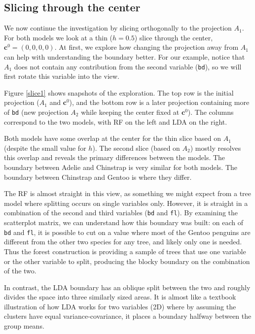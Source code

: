 \documentclass[]{interact}
\theoremstyle{plain}%
\theoremstyle{definition}
\theoremstyle{remark}
\begin{document}
\hypertarget{slicing-through-the-center}{%
\subsection{Slicing through the
center}\label{slicing-through-the-center}}

We now continue the investigation by slicing orthogonally to the
projection \(A_1\). For both models we look at a thin (\(h=0.5\)) slice
through the center, \(\mathbf{c}^0 = (0,0,0,0)\). At first, we explore
how changing the projection away from \(A_1\) can help with
understanding the boundary better. For our example, notice that \(A_1\)
does not contain any contribution from the second variable
(\texttt{bd}), so we will first rotate this variable into the view.

Figure \ref{slice1} shows snapshots of the exploration. The top row is
the initial projection (\(A_1\) and \(\mathbf{c}^0\)), and the bottom
row is a later projection containing more of \texttt{bd} (new projection
\(A_2\) while keeping the center fixed at \(\mathbf{c}^0\)). The columns
correspond to the two models, with RF on the left and LDA on the right.

Both models have some overlap at the center for the thin slice based on
\(A_1\) (despite the small value for \(h\)). The second slice (based on
\(A_2\)) mostly resolves this overlap and reveals the primary
differences between the models. The boundary between Adelie and
Chinstrap is very similar for both models. The boundary between
Chinstrap and Gentoo is where they differ.

The RF is almost straight in this view, as something we might expect
from a tree model where splitting occurs on single variables only.
However, it is straight in a combination of the second and third
variables (\texttt{bd} and \texttt{fl}). By examining the scatterplot
matrix, we can understand how this boundary was built: on each of
\texttt{bd} and \texttt{fl}, it is possible to cut on a value where most
of the Gentoo penguins are different from the other two species for any
tree, and likely only one is needed. Thus the forest construction is
providing a sample of trees that use one variable or the other variable
to split, producing the blocky boundary on the combination of the two.

In contrast, the LDA boundary has an oblique split between the two and
roughly divides the space into three similarly sized areas. It is almost
like a textbook illustration of how LDA works for two variables (2D)
where by assuming the clusters have equal variance-covariance, it places
a boundary halfway between the group means.
\end{document}
